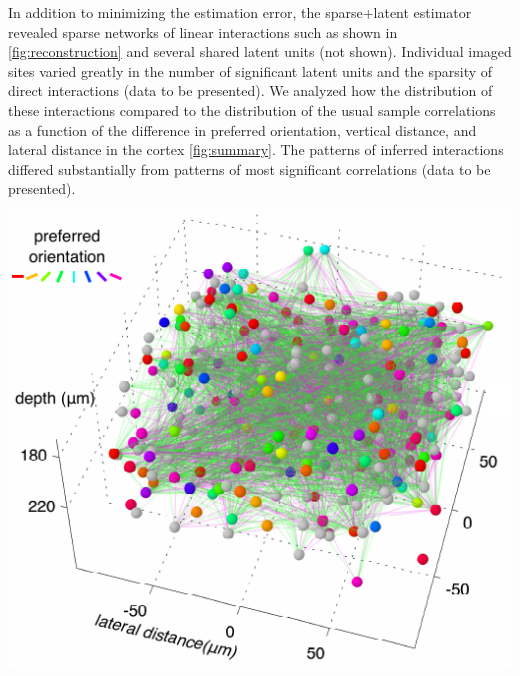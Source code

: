 \documentclass[12pt]{amsart}
\newenvironment{Figure}
  {\par\medskip\noindent\minipage{\linewidth}}
  {\endminipage\par\medskip}
\begin{document}
In addition to minimizing the estimation error, the sparse+latent estimator revealed sparse networks of linear interactions such as shown in \autoref{fig:reconstruction} and several shared latent units (not shown).
Individual imaged sites varied greatly in the number of significant latent units and the sparsity of direct interactions (data to be presented).
We analyzed how the distribution of these interactions compared to the distribution of the usual sample correlations as a function of the difference in preferred orientation, vertical distance, and lateral distance in the cortex \autoref{fig:summary}. The patterns of inferred interactions differed substantially from patterns of most significant correlations (data to be presented).
\begin{multicols}{2}
\begin{Figure}
  \includegraphics{./Reconstruction.pdf}
  \label{fig:reconstruction}
\end{Figure}


\end{multicols}
\end{document}
